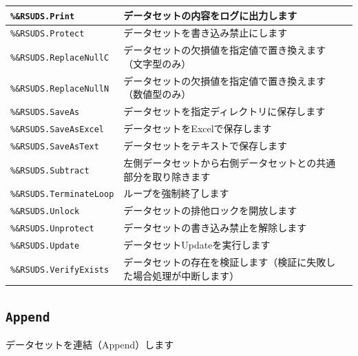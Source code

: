\begin{center}
{\begin{xltabular}{\textwidth}{|p{4truecm}|X|p{1.2truecm}|}
\hline
\texttt{\%\&RSUDS.Print}&データセットの内容をログに出力します&\\
\hline
\texttt{\%\&RSUDS.Protect}&データセットを書き込み禁止にします&\\
\hline
\texttt{\%\&RSUDS.ReplaceNullC}&データセットの欠損値を指定値で置き換えます（文字型のみ）&\\
\hline
\texttt{\%\&RSUDS.ReplaceNullN}&データセットの欠損値を指定値で置き換えます（数値型のみ）&\\
\hline
\texttt{\%\&RSUDS.SaveAs}&データセットを指定ディレクトリに保存します&\\
\hline
\texttt{\%\&RSUDS.SaveAsExcel}&データセットをExcelで保存します&\\
\hline
\texttt{\%\&RSUDS.SaveAsText}&データセットをテキストで保存します&\\
\hline
\texttt{\%\&RSUDS.Subtract}&左側データセットから右側データセットとの共通部分を取り除きます&\\
\hline
\texttt{\%\&RSUDS.TerminateLoop}&ループを強制終了します&\\
\hline
\texttt{\%\&RSUDS.Unlock}&データセットの排他ロックを開放します&\\
\hline
\texttt{\%\&RSUDS.Unprotect}&データセットの書き込み禁止を解除します&\\
\hline
\texttt{\%\&RSUDS.Update}&データセットUpdateを実行します&\\
\hline
\texttt{\%\&RSUDS.VerifyExists}&データセットの存在を検証します（検証に失敗した場合処理が中断します）&\\
\hline
\end{xltabular}
}
\end{center}
\subsection{\texttt{Append}}\label{subsec:RSUDS_RSUDS__Append}
データセットを連結（Append）します
